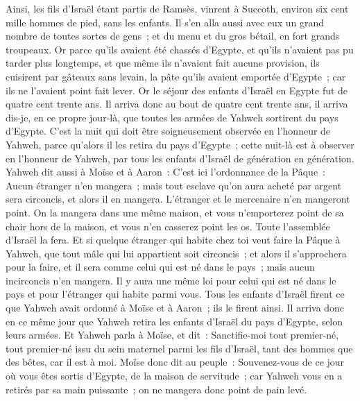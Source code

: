 \begin{multicols}{2}
Ainsi, les fils d'Israël étant partis de Ramsès, vinrent à Succoth, environ six cent mille hommes de pied, sans les enfants.
Il s'en alla aussi avec eux un grand nombre de toutes sortes de gens~; et du menu et du gros bétail, en fort grands troupeaux.
 Or parce qu'ils avaient été chassés d'Egypte, et qu'ils n'avaient pas pu tarder plus longtemps, et que même ils n'avaient fait aucune provision, ils cuisirent par gâteaux sans levain, la pâte qu'ils avaient emportée d'Egypte~; car ils ne l'avaient point fait lever. 
Or le séjour des enfants d'Israël en Egypte fut de quatre cent trente ans.
Il arriva donc au bout de quatre cent trente ans, il arriva dis-je, en ce propre jour-là, que toutes les armées de Yahweh sortirent du pays d'Egypte.
C'est la nuit qui doit être soigneusement observée en l'honneur de Yahweh, parce qu'alors il les retira du pays d'Egypte~; cette nuit-là est à observer en l'honneur de Yahweh, par tous les enfants d'Israël de génération en génération.
Yahweh dit aussi à Moïse et à Aaron~: C'est ici l'ordonnance de la Pâque~: Aucun étranger n'en mangera~;
mais tout esclave qu'on aura acheté par argent sera circoncis, et alors il en mangera.
L'étranger et le mercenaire n'en mangeront point.
On la mangera dans une même maison, et vous n'emporterez point de sa chair hors de la maison, et vous n'en casserez point les os.
Toute l'assemblée d'Israël la fera.
Et si quelque étranger qui habite chez toi veut faire la Pâque à Yahweh, que tout mâle qui lui appartient soit circoncis~; et alors il s'approchera pour la faire, et il sera comme celui qui est né dans le pays~; mais aucun incirconcis n'en mangera.
Il y aura une même loi pour celui qui est né dans le pays et pour l'étranger qui habite parmi vous.
Tous les enfants d'Israël firent ce que Yahweh avait ordonné à Moïse et à Aaron~; ils le firent ainsi.
Il arriva donc en ce même jour que Yahweh retira les enfants d'Israël du pays d'Egypte, selon leurs armées.
\VerseOne{}Et Yahweh parla à Moïse, et dit~:
Sanctifie-moi tout premier-né, tout premier-né issu du sein maternel parmi les fils d'Israël, tant des hommes que des bêtes, car il est à moi.
Moïse donc dit au peuple~: Souvenez-vous de ce jour où vous êtes sortis d'Egypte, de la maison de servitude~; car Yahweh vous en a retirés par sa main puissante~; on ne mangera donc point de pain levé.

\end{multicols}
